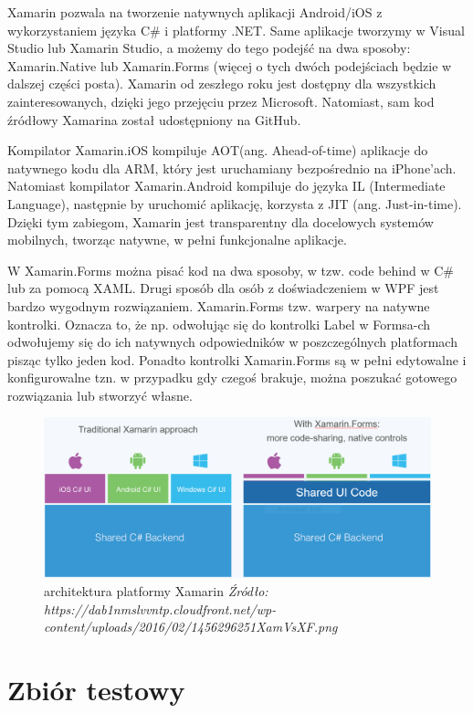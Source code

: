 \documentclass[brudnopis]{xmgr}
\begin{document}
Xamarin\cite{15} pozwala na tworzenie natywnych aplikacji Android/iOS z wykorzystaniem języka C\# i platformy .NET. Same aplikacje tworzymy w Visual Studio lub Xamarin Studio, a możemy do tego podejść na dwa sposoby: Xamarin.Native lub Xamarin.Forms (więcej o tych dwóch podejściach będzie w dalszej części posta). Xamarin od zeszłego roku jest dostępny dla wszystkich zainteresowanych, dzięki jego przejęciu przez Microsoft. Natomiast, sam kod źródłowy Xamarina został udostępniony na GitHub.

Kompilator Xamarin.iOS kompiluje AOT(ang. Ahead-of-time) aplikacje do natywnego kodu dla ARM, który jest uruchamiany bezpośrednio na iPhone’ach.
Natomiast kompilator Xamarin.Android kompiluje do języka IL (Intermediate Language), następnie by uruchomić aplikację, korzysta z JIT (ang. Just-in-time).
Dzięki tym zabiegom, Xamarin jest transparentny dla docelowych systemów mobilnych, tworząc natywne, w pełni funkcjonalne aplikacje.

W Xamarin.Forms\cite{6} można pisać kod na dwa sposoby, w tzw. code behind w C\# lub za pomocą XAML. Drugi sposób dla osób z doświadczeniem w WPF jest bardzo wygodnym rozwiązaniem. Xamarin.Forms tzw. warpery na natywne kontrolki. Oznacza to, że np. odwołując się do kontrolki Label w Formsa-ch odwołujemy się do ich natywnych odpowiedników w poszczególnych platformach pisząc tylko jeden kod. Ponadto kontrolki Xamarin.Forms są w pełni edytowalne i konfigurowalne tzn. w przypadku gdy czegoś brakuje, można poszukać gotowego rozwiązania lub stworzyć własne.

\begin{figure}[!tbh]
\centering
\includegraphics[width=1\hsize]{fig/xamarin}
\caption{architektura platformy Xamarin \emph{Źródło: https://dab1nmslvvntp.cloudfront.net/wp-content/uploads/2016/02/1456296251XamVsXF.png}}
\end{figure}
\newpage

\section{Zbiór testowy}
\end{document}
